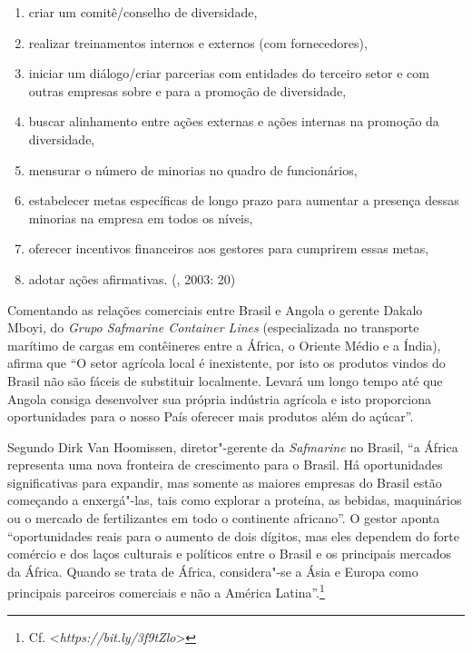 \begin{enumerate}
\def\labelenumi{\alph{enumi}.}
\item criar um comitê/conselho de diversidade,

\item realizar treinamentos internos e externos (com fornecedores),

\item iniciar um diálogo/criar parcerias com entidades do terceiro setor e
com outras empresas sobre e para a promoção de diversidade,

\item buscar alinhamento entre ações externas e ações internas na promoção
da diversidade,

\item mensurar o número de minorias no quadro de funcionários,

\item estabelecer metas específicas de longo prazo para aumentar a presença
dessas minorias na empresa em todos os níveis,

\item oferecer incentivos financeiros aos gestores para cumprirem essas
metas,

\item adotar ações afirmativas. (, 2003: 20)
\end{enumerate}

Comentando as relações comerciais entre Brasil e Angola o gerente Dakalo
Mboyi, do \emph{Grupo Safmarine Container Lines} (especializada no
transporte marítimo de cargas em contêineres entre a África, o Oriente
Médio e a Índia), afirma que ``O setor agrícola local é inexistente, por
isto os produtos vindos do Brasil não são fáceis de substituir
localmente. Levará um longo tempo até que Angola consiga desenvolver sua
própria indústria agrícola e isto proporciona oportunidades para o nosso
País oferecer mais produtos além do açúcar''.

Segundo Dirk Van Hoomissen, diretor"-gerente da \emph{Safmarine} no
Brasil, ``a África representa uma nova fronteira de crescimento para o
Brasil. Há oportunidades significativas para expandir, mas somente as
maiores empresas do Brasil estão começando a enxergá"-las, tais como
explorar a proteína, as bebidas, maquinários ou o mercado de
fertilizantes em todo o continente africano''. O gestor aponta
``oportunidades reais para o aumento de dois dígitos, mas eles dependem
do forte comércio e dos laços culturais e políticos entre o Brasil e os
principais mercados da África. Quando se trata de África, considera"-se a
Ásia e Europa como principais parceiros comerciais e não a América
Latina''.\footnote{Cf. \textless{}\emph{https://bit.ly/3f9tZlo}\textgreater{}}

